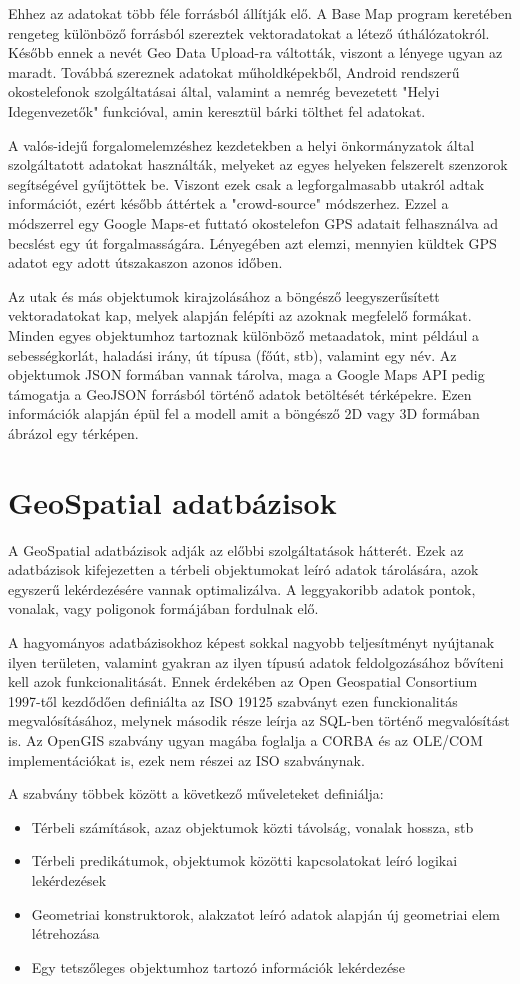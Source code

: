 Ehhez az adatokat több féle forrásból állítják elő. A Base Map program keretében rengeteg különböző forrásból
szereztek vektoradatokat a létező úthálózatokról. Később ennek a nevét Geo Data Upload-ra váltották, viszont a lényege ugyan az maradt.
Továbbá szereznek adatokat műholdképekből, Android rendszerű okostelefonok szolgáltatásai által, valamint a nemrég bevezetett "Helyi Idegenvezetők" funkcióval, amin keresztül
bárki tölthet fel adatokat. 

A valós-idejű forgalomelemzéshez kezdetekben a helyi önkormányzatok által szolgáltatott adatokat használták, melyeket az egyes helyeken felszerelt
szenzorok segítségével gyűjtöttek be. Viszont ezek csak a legforgalmasabb utakról adtak információt, ezért később áttértek a "crowd-source" módszerhez. Ezzel a módszerrel egy
Google Maps-et futtató okostelefon GPS adatait felhasználva ad becslést egy út forgalmasságára. Lényegében azt elemzi, mennyien küldtek GPS adatot egy adott útszakaszon azonos időben.

Az utak és más objektumok kirajzolásához a böngésző leegyszerűsített vektoradatokat kap, melyek alapján felépíti az azoknak megfelelő formákat.
Minden egyes objektumhoz tartoznak különböző metaadatok, mint például a sebességkorlát, haladási irány, út típusa (főút, stb), valamint egy név. Az objektumok JSON formában vannak
tárolva, maga a Google Maps API pedig támogatja a GeoJSON forrásból történő adatok betöltését térképekre.
Ezen információk alapján épül fel a modell amit a böngésző 2D vagy 3D formában ábrázol egy térképen.
\section{GeoSpatial adatbázisok}

A GeoSpatial adatbázisok adják az előbbi szolgáltatások hátterét. Ezek az adatbázisok kifejezetten a térbeli objektumokat leíró adatok tárolására, azok egyszerű lekérdezésére
vannak optimalizálva. A leggyakoribb adatok pontok, vonalak, vagy poligonok formájában fordulnak elő. 

A hagyományos adatbázisokhoz képest sokkal nagyobb teljesítményt nyújtanak
ilyen területen, valamint gyakran az ilyen típusú adatok feldolgozásához bővíteni kell azok funkcionalitását. Ennek érdekében az Open Geospatial Consortium 1997-től kezdődően
definiálta az ISO 19125 szabványt ezen funckionalitás megvalósításához, melynek második része leírja az SQL-ben történő megvalósítást is. Az OpenGIS szabvány ugyan magába
foglalja a CORBA és az OLE/COM implementációkat is, ezek nem részei az ISO szabványnak.

A szabvány többek között a következő műveleteket definiálja:
\begin{itemize}
\item Térbeli számítások, azaz objektumok közti távolság, vonalak hossza, stb
\item Térbeli predikátumok, objektumok közötti kapcsolatokat leíró logikai lekérdezések
\item Geometriai konstruktorok, alakzatot leíró adatok alapján új geometriai elem létrehozása
\item Egy tetszőleges objektumhoz tartozó információk lekérdezése
\end{itemize}

